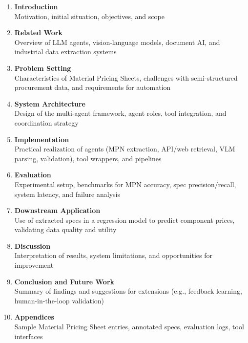 \documentclass[11pt]{article}
\begin{document}
\begin{enumerate}
  \item \textbf{Introduction} \\
  Motivation, initial situation, objectives, and scope

  \item \textbf{Related Work} \\
  Overview of LLM agents, vision-language models, document AI, and industrial data extraction systems

  \item \textbf{Problem Setting} \\
  Characteristics of Material Pricing Sheets, challenges with semi-structured procurement data, and requirements for automation

  \item \textbf{System Architecture} \\
  Design of the multi-agent framework, agent roles, tool integration, and coordination strategy

  \item \textbf{Implementation} \\
  Practical realization of agents (MPN extraction, API/web retrieval, VLM parsing, validation), tool wrappers, and pipelines

  \item \textbf{Evaluation} \\
  Experimental setup, benchmarks for MPN accuracy, spec precision/recall, system latency, and failure analysis

  \item \textbf{Downstream Application} \\
  Use of extracted specs in a regression model to predict component prices, validating data quality and utility

  \item \textbf{Discussion} \\
  Interpretation of results, system limitations, and opportunities for improvement

  \item \textbf{Conclusion and Future Work} \\
  Summary of findings and suggestions for extensions (e.g., feedback learning, human-in-the-loop validation)

  \item \textbf{Appendices} \\
  Sample Material Pricing Sheet entries, annotated specs, evaluation logs, tool interfaces
\end{enumerate}
\end{document}
